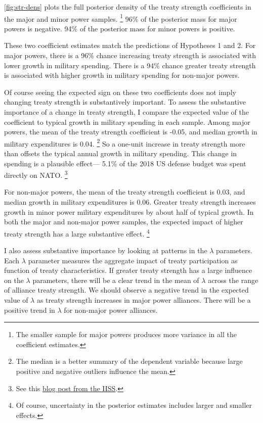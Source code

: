 \documentclass[12pt]{article}
\begin{document}
\autoref{fig:str-dens} plots the full posterior density of the treaty strength coefficients in the major and minor power samples.
\footnote{The smaller sample for major powers produces more variance in all the coefficient estimates.} 
96\% of the posterior mass for major powers is negative. 
94\% of the posterior mass for minor powers is positive. 


These two coefficient estimates match the predictions of Hypotheses 1 and 2. 
For major powers, there is a 96\% chance increasing treaty strength is associated with lower growth in military spending. 
There is a 94\% chance greater treaty strength is associated with higher growth in military spending for non-major powers.


Of course seeing the expected sign on these two coefficients does not imply changing treaty strength is substantively important. 
To assess the substantive importance of a change in treaty strength, I compare the expected value of the coefficient to typical growth in military spending in each sample. 
Among major powers, the mean of the treaty strength coefficient is -0.05, and median growth in military expenditures is 0.04.
\footnote{The median is a better summary of the dependent variable because large positive and negative outliers influence the mean.} 
So a one-unit increase in treaty strength more than offsets the typical annual growth in military spending. 
This change in spending is a plausible effect--- 5.1\% of the 2018 US defense budget was spent directly on NATO.
\footnote{See this \href{https://www.iiss.org/blogs/military-balance/2018/07/us-and-nato-allies-costs-and-value}{blog post from the IISS}.} 


For non-major powers, the mean of the treaty strength coefficient is 0.03, and median growth in military expenditures is 0.06. 
Greater treaty strength increases growth in minor power military expenditures by about half of typical growth. 
In both the major and non-major power samples, the expected impact of higher treaty strength has a large substantive effect. 
\footnote{Of course, uncertainty in the posterior estimates includes larger and smaller effects.}


I also assess substantive importance by looking at patterns in the $\lambda$ parameters. 
Each $\lambda$ parameter measures the aggregate impact of treaty participation as function of treaty characteristics. 
If greater treaty strength has a large influence on the $\lambda$ parameters, there will be a clear trend in the mean of $\lambda$ across the range of alliance treaty strength.
We should observe a negative trend in the expected value of $\lambda$ as treaty strength increases in major power alliances. 
There will be a positive trend in $\lambda$ for non-major power alliances. 
\end{document}
